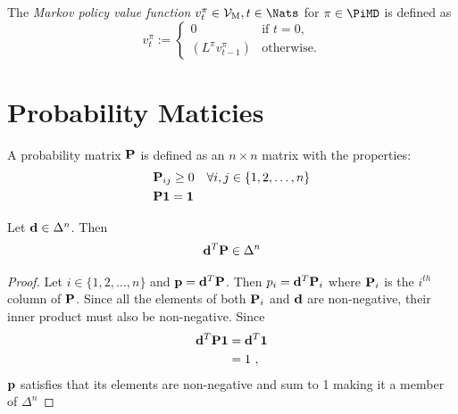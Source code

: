 \begin{definition} \label{def:v-dp-pi}
  The \emph{Markov policy value function} $v^{\pi}_t\in \mathcal{V}_{\mathrm{M}}, t \in \Nats$  for $\pi\in \PiMD$ is defined as
  \[
    v^{\pi}_t :=
    \begin{cases}
      0 &\text{if } t = 0, \\
      (L^{\pi}  v^{\pi}_{t-1}) &\text{otherwise}.
    \end{cases}
  \]
\end{definition}

\section{Probability Maticies}


\begin{definition}
A probability matrix $\bold{P}$ is defined as an $n \times n$ matrix with the properties:
\begin{align*}
	&\bold{P}_{ij} \geq 0 \quad \forall i,j \in \{1,2,\dots,n\} \\
	&\bold{P}\bold{1} = \bold{1} 
\end{align*}
\end{definition}
\begin{theorem}
Let $\bold{d} \in \Delta^n$. Then
\[
\bold{d}^{T}\bold{P} \in \Delta^n
\]
\end{theorem}
\begin{proof}
Let $i \in \{1,2,\dots,n\}$ and $\bold{p} = \bold{d}^{T}\bold{P} $. Then $p_i = \bold{d}^{T}\bold{P}_i$ where $\bold{P}_i$ is the $i^{th}$ column of $\bold{P}$. Since all the elements of both $\bold{P}_i$ and $\bold{d}$ are non-negative, their inner product must also be non-negative. Since
\begin{align*}
	\bold{d}^{T}\bold{P}\bold{1} &= \bold{d}^{T}\bold{1} \\
	&= 1~,
\end{align*}
$\bold{p}$ satisfies that its elements are non-negative and sum to 1 making it a member of $\Delta^n$
\end{proof}

